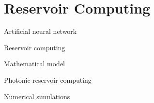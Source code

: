 \section{Reservoir Computing}

\begin{frame}{Artificial neural network}
	
\end{frame}

\begin{frame}{Reservoir computing}
	
\end{frame}

\begin{frame}{Mathematical model}
	
\end{frame}

\begin{frame}{Photonic reservoir computing}
	
\end{frame}

\begin{frame}{Numerical simulations}
	
\end{frame}